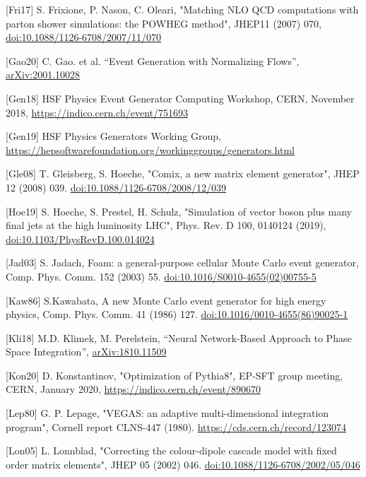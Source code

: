 \documentclass[11pt,a4paper]{article}
\begin{document}
{[}Fri17{]} S. Frixione, P. Nason, C. Oleari, "Matching NLO QCD
computations with parton shower simulations: the POWHEG method", JHEP11
(2007) 070,
\href{https://doi.org/10.1088/1126-6708/2007/11/070}{{doi:10.1088/1126-6708/2007/11/070}}

{[}Gao20{]} C. Gao. et al. ``Event Generation with Normalizing Flows'',
\href{https://arxiv.org/abs/2001.10028}{{arXiv:2001.10028}}

{[}Gen18{]} HSF Physics Event Generator Computing Workshop, CERN,
November 2018,
\href{https://indico.cern.ch/event/751693}{{https://indico.cern.ch/event/751693}}

{[}Gen19{]} HSF Physics Generators Working Group,
\href{https://hepsoftwarefoundation.org/workinggroups/generators.html}{{https://hepsoftwarefoundation.org/workinggroups/generators.html}}

{[}Gle08{]} T. Gleisberg, S. Hoeche, "Comix, a new matrix element
generator", JHEP 12 (2008) 039.
\href{https://doi.org/10.1088/1126-6708/2008/12/039}{{doi:10.1088/1126-6708/2008/12/039}}

{[}Hoe19{]} S. Hoeche, S. Prestel, H. Schulz, "Simulation of vector
boson plus many final jets at the high luminosity LHC", Phys. Rev. D
100, 0140124 (2019),
\href{http://dx.doi.org/10.1103/PhysRevD.100.014024}{{doi:10.1103/PhysRevD.100.014024}}

{[}Jad03{]} S. Jadach, Foam: a general-purpose cellular Monte Carlo
event generator, Comp. Phys. Comm. 152 (2003) 55.
\href{https://doi.org/10.1016/S0010-4655(02)00755-5}{{doi:10.1016/S0010-4655(02)00755-5}}

{[}Kaw86{]} S.Kawabata, A new Monte Carlo event generator for high
energy physics, Comp. Phys. Comm. 41 (1986) 127.
\href{https://doi.org/10.1016/0010-4655(86)90025-1}{{doi:10.1016/0010-4655(86)90025-1}}

{[}Kli18{]} M.D. Klimek, M. Perelstein, ``Neural Network-Based Approach
to Phase Space Integration'',
\href{https://arxiv.org/abs/1810.11509}{{arXiv:1810.11509}}

{[}Kon20{]} D. Konstantinov, "Optimization of Pythia8", EP-SFT group
meeting, CERN, January 2020,
\href{https://indico.cern.ch/event/890670}{{https://indico.cern.ch/event/890670}}

{[}Lep80{]} G. P. Lepage, "VEGAS: an adaptive multi-dimensional
integration program", Cornell report CLNS-447 (1980).
\href{https://cds.cern.ch/record/123074}{{https://cds.cern.ch/record/123074}}

{[}Lon05{]} L. Lonnblad, "Correcting the colour-dipole cascade model
with fixed order matrix elements", JHEP 05 (2002) 046.
\href{https://doi.org/10.1088/1126-6708/2002/05/046}{{doi:10.1088/1126-6708/2002/05/046}}
\end{document}

